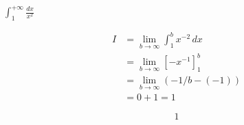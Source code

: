 $\displaystyle \int_{1}^{+\infty} \frac{dx}{x^2}$

\nopagebreak
\begin{align*}
I &= \lim_{b \to \infty} \int_{1}^{b} x^{-2} \, dx \\
&= \lim_{b \to \infty} \left[ -x^{-1} \right]_{1}^{b} \\
&= \lim_{b \to \infty} (-1/b - (-1)) \\
&= 0 + 1 = 1
\end{align*}

\[
\boxed{\displaystyle 1}
\]
